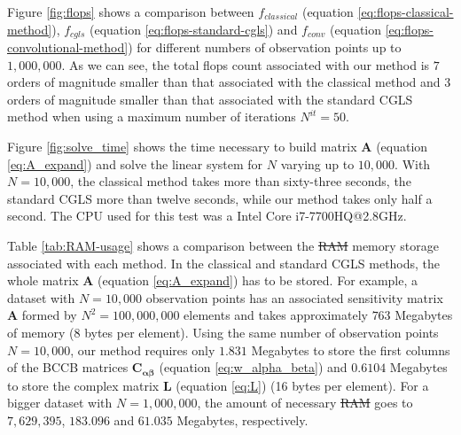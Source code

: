\documentclass[manuscript]{geophysics}
\providecommand{\DIFaddtex}[1]{{\protect\color{blue}\uwave{#1}}} %
\providecommand{\DIFdeltex}[1]{{\protect\color{red}\sout{#1}}}                      %
\providecommand{\DIFaddbegin}{} %
\providecommand{\DIFaddend}{} %
\providecommand{\DIFdelbegin}{} %
\providecommand{\DIFdelend}{} %
\providecommand{\DIFadd}[1]{\texorpdfstring{\DIFaddtex{#1}}{#1}} %
\providecommand{\DIFdel}[1]{\texorpdfstring{\DIFdeltex{#1}}{}} %
\begin{document}
Figure \ref{fig:flops} shows a comparison between 
$f_{classical}$ (equation \ref{eq:flops-classical-method}), 
$f_{cgls}$ (equation \ref{eq:flops-standard-cgls}) and 
$f_{conv}$ (equation \ref{eq:flops-convolutional-method})
for different numbers of observation points up to $1,000,000$. As we can see, 
the total flops count associated with our method is $7$ orders of magnitude smaller 
than that associated with the classical method and $3$ orders of magnitude smaller than
that associated with the standard CGLS method when using a maximum number
of iterations $N^{it} = 50$. 

Figure \ref{fig:solve_time} shows the time necessary to build matrix $\mathbf{A}$ 
(equation \ref{eq:A_expand}) and solve the linear system for $N$ varying up to $10,000$. 
With $N = 10,000$, the classical method takes more than sixty-three seconds, the standard 
CGLS more than twelve seconds, while our method takes only half a second. 
The CPU used for this test was a Intel Core i7-7700HQ@2.8GHz.


Table \ref{tab:RAM-usage} shows a comparison between the \DIFdelbegin \DIFdel{RAM }\DIFdelend \DIFaddbegin \DIFadd{computer }\DIFaddend memory storage 
associated with each method. In the classical and standard CGLS methods, the whole 
matrix $\mathbf{A}$ (equation \ref{eq:A_expand}) has to be stored. For example, a dataset with 
$N = 10,000$ observation points has an associated sensitivity matrix $\mathbf{A}$ formed by 
$N^2 = 100,000,000$ elements and takes approximately $763$ Megabytes of memory (8 bytes per element). 
Using the same number of observation points $N = 10,000$, our method requires only 
$1.831$ Megabytes to store the first columns of the BCCB matrices
$\mathbf{C}_{\boldsymbol{\alpha\beta}}$ (equation \ref{eq:w_alpha_beta}) and 
$0.6104$ Megabytes to store the complex matrix $\mathbf{L}$ (equation \ref{eq:L}) 
(16 bytes per element). For a bigger dataset with $N = 1,000,000$, the amount of necessary \DIFdelbegin \DIFdel{RAM 
}\DIFdelend \DIFaddbegin \DIFadd{computer memory 
}\DIFaddend goes to $7,629,395$, $183.096$ and $61.035$ Megabytes, respectively.
\end{document}
